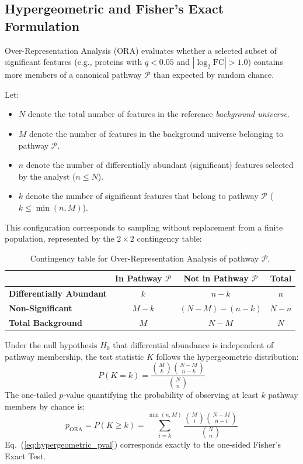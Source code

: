 \documentclass[11pt,twoside,openright]{book}
\begin{document}
\subsection{Hypergeometric and Fisher's Exact Formulation}

Over-Representation Analysis (ORA) evaluates whether a selected subset of significant features (e.g., proteins with $q < 0.05$ and $|\log_2 \text{FC}| > 1.0$) contains more members of a canonical pathway $\mathcal{P}$ than expected by random chance.

Let:
\begin{itemize}
    \item $N$ denote the total number of features in the reference \textit{background universe}.
    \item $M$ denote the number of features in the background universe belonging to pathway $\mathcal{P}$.
    \item $n$ denote the number of differentially abundant (significant) features selected by the analyst ($n \le N$).
    \item $k$ denote the number of significant features that belong to pathway $\mathcal{P}$ ($k \le \min(n, M)$).
\end{itemize}

This configuration corresponds to sampling without replacement from a finite population, represented by the $2 \times 2$ contingency table:

\begin{table}[htbp]
\centering
\small
\caption{Contingency table for Over-Representation Analysis of pathway $\mathcal{P}$.}
\label{tab:ora_contingency}
\begin{tabular}{lccc}
\toprule
 & \textbf{In Pathway $\mathcal{P}$} & \textbf{Not in Pathway $\mathcal{P}$} & \textbf{Total} \\
\midrule
\textbf{Differentially Abundant} & $k$ & $n - k$ & $n$ \\
\textbf{Non-Significant} & $M - k$ & $(N - M) - (n - k)$ & $N - n$ \\
\midrule
\textbf{Total Background} & $M$ & $N - M$ & $N$ \\
\bottomrule
\end{tabular}
\end{table}

Under the null hypothesis $H_0$ that differential abundance is independent of pathway membership, the test statistic $K$ follows the hypergeometric distribution:
\begin{equation}
\label{eq:hypergeometric_pmf}
P(K = k) = \frac{\binom{M}{k} \binom{N - M}{n - k}}{\binom{N}{n}}
\end{equation}
The one-tailed $p$-value quantifying the probability of observing at least $k$ pathway members by chance is:
\begin{equation}
\label{eq:hypergeometric_pval}
p_{\text{ORA}} = P(K \ge k) = \sum_{i=k}^{\min(n, M)} \frac{\binom{M}{i} \binom{N - M}{n - i}}{\binom{N}{n}}
\end{equation}
Eq.~(\ref{eq:hypergeometric_pval}) corresponds exactly to the one-sided Fisher's Exact Test.
\end{document}
